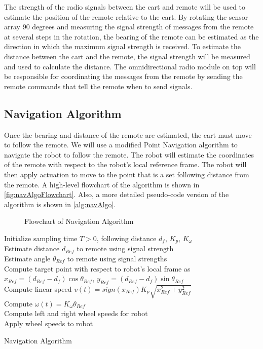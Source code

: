\documentclass[letterpaper,12pt]{article}   %
\begin{document}
\vspace*{12pt}
\noindent
The strength of the radio signals between the cart and remote will be used to estimate the position of the remote relative to the cart. By rotating the sensor array 90 degrees and measuring the signal strength of messages from the remote at several steps in the rotation, the bearing of the remote can be estimated as the direction in which the maximum signal strength is received. To estimate the distance between the cart and the remote, the signal strength will be measured and used to calculate the distance. The omnidirectional radio module on top will be responsible for coordinating the messages from the remote by sending the remote commands that tell the remote when to send signals.

\subsection{Navigation Algorithm}
Once the bearing and distance of the remote are estimated, the cart must move to follow the remote. We will use a modified Point Navigation algorithm to navigate the robot to follow the remote. The robot will estimate the coordinates of the remote with respect to the robot's local reference frame. The robot will then apply actuation to move to the point that is a set following distance from the remote. A high-level flowchart of the algorithm is shown in \autoref{fig:navAlgoFlowchart}. Also, a more detailed pseudo-code version of the algorithm is shown in \autoref{alg:navAlgo}.

\begin{figure}
  \centering
  
  \caption{Flowchart of Navigation Algorithm}
  \label{fig:navAlgoFlowchart}
\end{figure}

\begin{algorithm}[h!]
  \SetAlgoLined
  \Begin
  {
    Initialize sampling time $T > 0$, following distance $d_f$, $K_p$, $K_\omega$\\
    {
      Estimate distance $d_{Ref}$ to remote using signal strength\\
      Estimate angle $\theta_{Ref}$ to remote using signal strengths\\
      Compute target point with respect to robot's local frame as $x_{Ref} = (d_{Ref} - d_f)\cos \theta_{Ref}$, $y_{Ref} = (d_{Ref} - d_f)\sin \theta_{Ref}$\\
      Compute linear speed $v(t) = sign(x_{Ref})K_p\sqrt{x_{Ref}^2 + y_{Ref}^2}$\\
      Compute $\omega(t) = K_\omega \theta_{Ref}$\\
      Compute left and right wheel speeds for robot\\
      Apply wheel speeds to robot\\
    }
  }
  \caption{Navigation Algorithm}
  \label{alg:navAlgo}
\end{algorithm}
\end{document}
